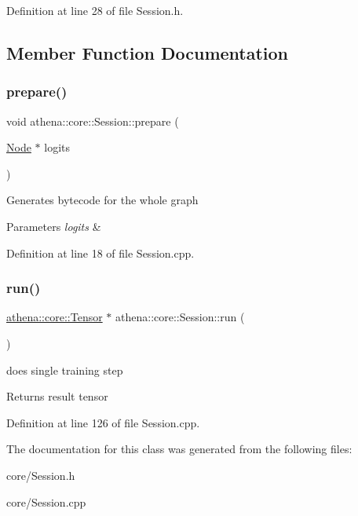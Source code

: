 Definition at line 28 of file Session.\+h.



\subsection{Member Function Documentation}
\mbox{\label{classathena_1_1core_1_1_session_a28b51416420aca2c39d9cf7ee81fe41d}} 
\subsubsection{\texorpdfstring{prepare()}{prepare()}}
{\footnotesize\ttfamily void athena\+::core\+::\+Session\+::prepare (\begin{DoxyParamCaption}\item[{\mbox{\hyperlink{classathena_1_1core_1_1_node}{Node}} $\ast$}]{logits }\end{DoxyParamCaption})}

Generates bytecode for the whole graph 
\begin{DoxyParams}{Parameters}
{\em logits} & \\
\hline
\end{DoxyParams}


Definition at line 18 of file Session.\+cpp.

\mbox{\label{classathena_1_1core_1_1_session_ab08af50ae0bbd2ed5171e1f45a7680ff}} 
\subsubsection{\texorpdfstring{run()}{run()}}
{\footnotesize\ttfamily \mbox{\hyperlink{classathena_1_1core_1_1_tensor}{athena\+::core\+::\+Tensor}} $\ast$ athena\+::core\+::\+Session\+::run (\begin{DoxyParamCaption}{ }\end{DoxyParamCaption})}

does single training step \begin{DoxyReturn}{Returns}
result tensor 
\end{DoxyReturn}


Definition at line 126 of file Session.\+cpp.



The documentation for this class was generated from the following files\+:\begin{DoxyCompactItemize}
\item 
core/Session.\+h\item 
core/Session.\+cpp\end{DoxyCompactItemize}
